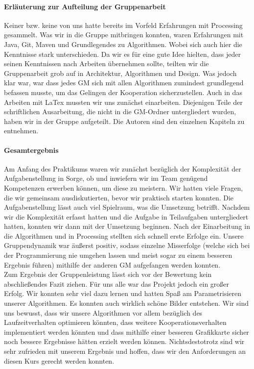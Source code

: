 \documentclass[../mciAusarbeitung.tex]{subfiles}
\begin{document}
\paragraph{Erläuterung zur Aufteilung der Gruppenarbeit}
Keiner bzw. keine von uns hatte bereits im Vorfeld Erfahrungen mit Processing gesammelt. Was wir in die Gruppe mitbringen konnten, waren Erfahrungen mit Java, Git, Maven und Grundlegendes zu Algorithmen. Wobei sich auch hier die Kenntnisse stark unterschieden. Da wir es für eine gute Idee hielten, dass jeder seinen Kenntnissen nach Arbeiten übernehmen sollte, teilten wir die Gruppenarbeit grob auf in Architektur, Algorithmen und Design. Was jedoch klar war, war dass jedes GM sich mit allen Algorithmen zumindest grundlegend befassen musste, um das Gelingen der Kooperation sicherzustellen. Auch in das Arbeiten mit LaTex mussten wir uns zunächst einarbeiten. Diejenigen Teile der schriftlichen Ausarbeitung, die nicht in die GM-Ordner untergliedert wurden, haben wir in der Gruppe aufgeteilt. Die Autoren sind den einzelnen Kapiteln zu entnehmen.
	
\paragraph{Gesamtergebnis}
Am Anfang des Praktikums waren wir zunächst bezüglich der Komplexität der Aufgabenstellung in Sorge, ob und inwiefern wir im Team genügend Kompetenzen erwerben können, um diese zu meistern. Wir hatten viele Fragen, die wir gemeinsam ausdiskutierten, bevor wir praktisch starten konnten. Die Aufgabenstellung lässt auch viel Spielraum, was die Umsetzung betrifft. Nachdem wir die Komplexität erfasst hatten und die Aufgabe in Teilaufgaben untergliedert hatten, konnten wir dann mit der Umsetzung beginnen. Nach der Einarbeitung in die Algorithmen und in Processing stellten sich schnell erste Erfolge ein. Unsere Gruppendynamik war äußerst positiv, sodass einzelne Misserfolge (welche sich bei der Programmierung nie umgehen lassen und meist sogar zu einem besseren Ergebnis führen) mithilfe der anderen GM aufgefangen werden konnten.\\
Zum Ergebnis der Gruppenleistung lässt sich vor der Bewertung kein abschließendes Fazit ziehen. Für uns alle war das Projekt jedoch ein großer Erfolg. Wir konnten sehr viel dazu lernen und hatten Spaß am Parametrisieren unserer Algorithmen. Es konnten auch wirklich schöne Bilder entstehen. Wir sind uns bewusst, dass wir unsere Algorithmen vor allem bezüglich des Laufzeitverhalten optimieren könnten, dass weitere Kooperationsverhalten implementiert werden könnten und dass mithilfe einer besseren Grafikkarte sicher noch bessere Ergebnisse hätten erzielt werden können. Nichtsdestotrotz sind wir sehr zufrieden mit unserem Ergebnis und hoffen, dass wir den Anforderungen an diesen Kurs gerecht werden konnten.
	
\end{document}
